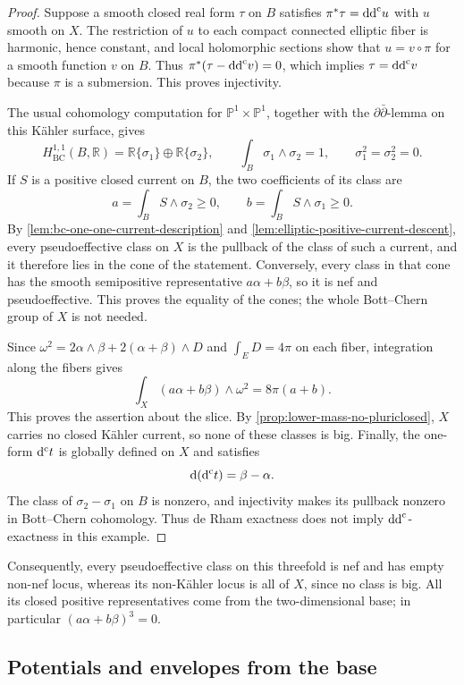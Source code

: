 \begin{proof}
Suppose a smooth closed real form $\tau$ on $B$ satisfies $\pi^*\tau=\mathrm{dd}^{\mathrm{c}} u$ with $u$ smooth on $X$. The restriction of $u$ to each compact connected elliptic fiber is harmonic, hence constant, and local holomorphic sections show that $u=v\circ\pi$ for a smooth function $v$ on $B$. Thus $\pi^*(\tau-\mathrm{dd}^{\mathrm{c}} v)=0$, which implies $\tau=\mathrm{dd}^{\mathrm{c}} v$ because $\pi$ is a submersion. This proves injectivity.

The usual cohomology computation for $\mathbb P^1\times\mathbb P^1$, together with the $\partial\bar\partial$-lemma on this K\"ahler surface, gives
\[
 H^{1,1}_{\mathrm{BC}}(B,\mathbb R)
       =\mathbb R\{\sigma_1\}\oplus\mathbb R\{\sigma_2\},
 \qquad \int_B\sigma_1\wedge\sigma_2=1,
 \qquad \sigma_1^2=\sigma_2^2=0.
\]
If $S$ is a positive closed current on $B$, the two coefficients of its class are
\[
 a=\int_BS\wedge\sigma_2\geq0,
 \qquad b=\int_BS\wedge\sigma_1\geq0.
\]
By \cref{lem:bc-one-one-current-description} and \cref{lem:elliptic-positive-current-descent}, every pseudoeffective class on $X$ is the pullback of the class of such a current, and it therefore lies in the cone of the statement. Conversely, every class in that cone has the smooth semipositive representative $a\alpha+b\beta$, so it is nef and pseudoeffective. This proves the equality of the cones; the whole Bott--Chern group of $X$ is not needed.

Since $\omega^2=2\alpha\wedge\beta+2(\alpha+\beta)\wedge D$ and $\int_E D=4\pi$ on each fiber, integration along the fibers gives
\[
 \int_X(a\alpha+b\beta)\wedge\omega^2=8\pi(a+b).
\]
This proves the assertion about the slice. By \cref{prop:lower-mass-no-pluriclosed}, $X$ carries no closed K\"ahler current, so none of these classes is big. Finally, the one-form $\mathrm d^{\mathrm c} t$ is globally defined on $X$ and satisfies
\[
 \mathrm{d}(\mathrm d^{\mathrm c} t)=\beta-\alpha.
\]
The class of $\sigma_2-\sigma_1$ on $B$ is nonzero, and injectivity makes its pullback nonzero in Bott--Chern cohomology. Thus de Rham exactness does not imply $\mathrm{dd}^{\mathrm{c}}$-exactness in this example.
\end{proof}

Consequently, every pseudoeffective class on this threefold is nef and has empty non-nef locus, whereas its non-K\"ahler locus is all of $X$, since no class is big. All its closed positive representatives come from the two-dimensional base; in particular $(a\alpha+b\beta)^3=0$.

\subsection{Potentials and envelopes from the base}

